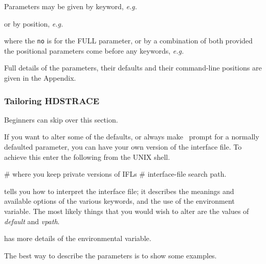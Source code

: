 \documentclass[11pt,nolof]{starlink}
\begin{document}
Parameters may be given by keyword, \emph{e.g.}\
\small
\begin{terminalv}
\end{terminalv}
\normalsize
or by position, \emph{e.g.}\

\small
\begin{terminalv}
\end{terminalv}
\normalsize
where the \texttt{no} is for the FULL parameter, or by a combination of both
provided the positional parameters come before any keywords, \emph{e.g.}\

\small
\begin{terminalv}
\end{terminalv}
\normalsize
Full details of the parameters, their defaults and their command-line
positions are given in the Appendix.

\subsubsection{Tailoring HDSTRACE}

Beginners can skip over this section.

If you want to alter some of the defaults, or always make
\HDSTRACE\ prompt for a normally defaulted parameter,
you can have your own version of the interface file.
To achieve this enter the following from the UNIX shell.

\small
\begin{terminalv}
                                # where you keep private versions of IFLs
                                # interface-file search path.
\end{terminalv}
\normalsize
{} tells you how to interpret the interface
file; it describes the meanings and available options of the various
keywords, and the use of the \envvar{ADAM\_IFL} environment variable.
The most likely things that you would wish to alter are the values of
\emph{default\/} and \emph{vpath}.

 has more details of the 
environmental variable.
\bigskip

The best way to describe the parameters is to show some examples.
\end{document}
